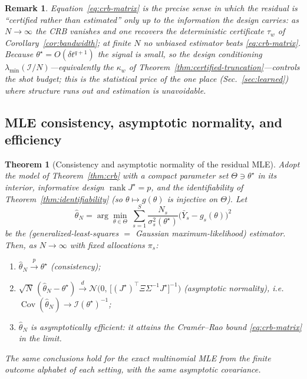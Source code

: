\documentclass[aps,prresearch,reprint,superscriptaddress,nofootinbib,amsmath,amssymb]{revtex4-2}
\newcommand{\dt}{\delta t}
\newtheorem{theorem}{Theorem}
\newtheorem{remark}{Remark}
\begin{document}
\begin{remark}
Equation~\eqref{eq:crb-matrix} is the precise sense in which the residual is ``certified rather than estimated'' only up to the information the design carries: as $N\to\infty$ the CRB vanishes and one recovers the deterministic certificate $\tau_w$ of Corollary~\ref{cor:bandwidth}; at finite $N$ no unbiased estimator beats \eqref{eq:crb-matrix}. Because $\theta^\star=O(\dt^{q+1})$ the signal is small, so the design conditioning $\lambda_{\min}(\mathcal{I}/N)$---equivalently the $\kappa_w$ of Theorem~\ref{thm:certified-truncation}---controls the shot budget; this is the statistical price of the one place (Sec.~\ref{sec:learned}) where structure runs out and estimation is unavoidable.
\end{remark}

\subsection{MLE consistency, asymptotic normality, and efficiency}
\label{app:inference-mle}

\begin{theorem}[Consistency and asymptotic normality of the residual MLE]
\label{thm:mle}
Adopt the model of Theorem~\ref{thm:crb} with a compact parameter set $\Theta\ni\theta^\star$ in its interior, informative design $\operatorname{rank}J^\star=p$, and the identifiability of Theorem~\ref{thm:identifiability} (so $\theta\mapsto g(\theta)$ is injective on $\Theta$). Let
\begin{equation}
    \hat\theta_N=\arg\min_{\theta\in\Theta}\ \sum_{s=1}^{S}\frac{N_s}{\sigma_s^2(\theta^\star)}\bigl(\bar Y_s-g_s(\theta)\bigr)^2
    \label{eq:gls}
\end{equation}
be the (generalized-least-squares $=$ Gaussian maximum-likelihood) estimator. Then, as $N\to\infty$ with fixed allocations $\pi_s$:
\begin{enumerate}
\item[(i)] $\hat\theta_N\xrightarrow{\ p\ }\theta^\star$ (consistency);
\item[(ii)] $\sqrt N\,(\hat\theta_N-\theta^\star)\xrightarrow{\ d\ }\mathcal{N}\!\bigl(0,\,\bigl[(J^\star)^\top\Xi\Sigma^{-1}J^\star\bigr]^{-1}\bigr)$ (asymptotic normality), i.e.\ $\operatorname{Cov}(\hat\theta_N)\to\mathcal{I}(\theta^\star)^{-1}$;
\item[(iii)] $\hat\theta_N$ is asymptotically efficient: it attains the Cram\'er--Rao bound \eqref{eq:crb-matrix} in the limit.
\end{enumerate}
The same conclusions hold for the exact multinomial MLE from the finite outcome alphabet of each setting, with the same asymptotic covariance.
\end{theorem}
\end{document}
